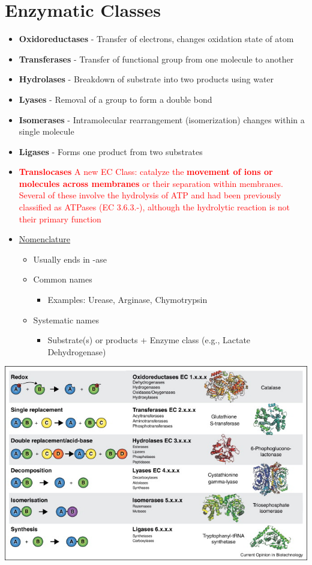 \documentclass[10pt]{article}
\begin{document}
\section*{Enzymatic Classes}
\begin{itemize}
    \item \textbf{Oxidoreductases} - Transfer of electrons, changes oxidation state of atom
    \item \textbf{Transferases} - Transfer of functional group from one molecule to another
    \item \textbf{Hydrolases} - Breakdown of substrate into two products using water
    \item \textbf{Lyases} - Removal of a group to form a double bond
    \item \textbf{Isomerases} - Intramolecular rearrangement (isomerization) changes within a single molecule
    \item \textbf{Ligases} - Forms one product from two substrates
    \item \textcolor{red}{\textbf{Translocases} A new EC Class: catalyze the \textbf{movement of ions or molecules across membranes} or their separation within membranes.  Several of these involve the hydrolysis of ATP and had been previously classified as ATPases (EC 3.6.3.-), although the hydrolytic reaction is not their primary function}
    \item \underline{Nomenclature}
    \begin{itemize}
        \item Usually ends in -ase
        \item Common names
        \begin{itemize}
            \item Examples: Urease, Arginase, Chymotrypsin
        \end{itemize}
        \item Systematic names
        \begin{itemize}
            \item Substrate(s) or products + Enzyme class (e.g., Lactate Dehydrogenase)
        \end{itemize}
    \end{itemize}
\end{itemize}
\begin{center}
    \includegraphics*[width=\textwidth]{L2_1.png}
\end{center}
\end{document}
